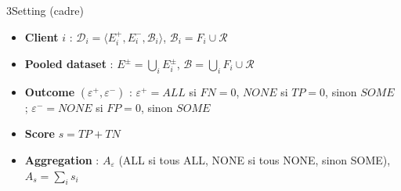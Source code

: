 \documentclass[10pt]{article}
\begin{document}
\begin{minipage}[t]{0.32\textwidth}
\begin{bloc}{\num{3}Setting (cadre)}
\begin{itemize}
  \item \textbf{Client} $i$ : $\mathcal{D}_i=\langle E_i^+,E_i^-,\mathcal{B}_i\rangle$, $\mathcal{B}_i=F_i\cup\mathcal{R}$
  \item \textbf{Pooled dataset} : $E^\pm=\bigcup_i E_i^\pm$, $\mathcal{B}=\bigcup_i F_i\cup\mathcal{R}$
  \item \textbf{Outcome} $(\varepsilon^+,\varepsilon^-)$ : $\varepsilon^+=\mathit{ALL}$ si $FN=0$, $\mathit{NONE}$ si $TP=0$, sinon $\mathit{SOME}$ ; $\varepsilon^-=\mathit{NONE}$ si $FP=0$, sinon $\mathit{SOME}$
  \item \textbf{Score} $s=TP+TN$
  \item \textbf{Aggregation} : $A_\varepsilon$ (ALL si tous ALL, NONE si tous NONE, sinon SOME), $A_s=\sum_i s_i$
\end{itemize}
\end{bloc}
\end{minipage}

\vspace{4pt}
\end{document}
